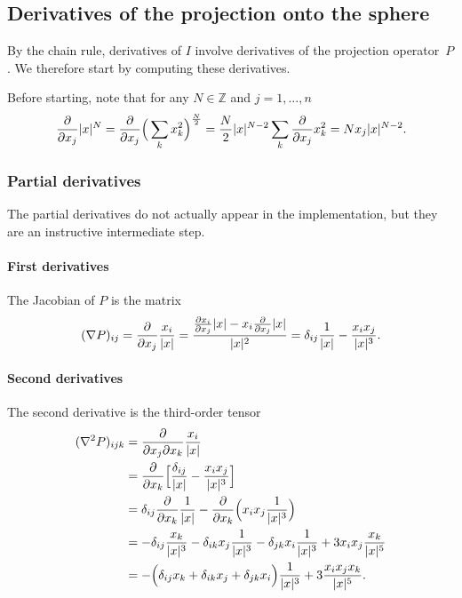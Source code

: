 \documentclass[a4paper]{article}
\DeclarePairedDelimiter{\abs}{\lvert}{\rvert}
\begin{document}
\subsection{Derivatives of the projection onto the sphere}

By the chain rule, derivatives of $I$ involve derivatives of the projection operator~$P$.
We therefore start by computing these derivatives.

Before starting, note that for any $N \in \mathbb{Z}$ and $j=1,\dots,n$
\begin{equation*}
 \frac{\partial}{\partial x_j} \abs{x}^N
 =
 \frac{\partial}{\partial x_j} \Big( \sum_k x_k^2 \Big)^{\frac{N}{2}}
 =
 \frac{N}{2} \abs{x}^{N-2} \sum_k \frac{\partial}{\partial x_j} x_k^2
 =
 N x_j \abs{x}^{N-2}.
\end{equation*}

\subsubsection{Partial derivatives}

The partial derivatives do not actually appear in the implementation, but they are
an instructive intermediate step.

\paragraph{First derivatives}

The Jacobian of $P$ is the matrix
 \begin{equation*}
  (\nabla P)_{ij}
  =
  \frac{\partial}{\partial x_j} \frac{x_i}{\abs{x}}
  =
  \frac{\frac{\partial x_i}{\partial x_j}\abs{x} - x_i \frac{\partial}{\partial x_j} \abs{x}}{\abs{x}^2}
  =
  \delta_{ij} \frac{1}{\abs{x}} - \frac{x_i x_j}{\abs{x}^3}.
 \end{equation*}

\paragraph{Second derivatives}
The second derivative is the third-order tensor
\begin{align*}
 (\nabla^2 P)_{ijk}
 & =
 \frac{\partial}{\partial x_j \partial x_k} \frac{x_i}{\abs{x}}
 \\
 & =
 \frac{\partial}{\partial x_k} \Big[ \frac{\delta_{ij}}{\abs{x}} - \frac{x_i x_j}{\abs{x}^3} \Big]
 \\
 & =
 \delta_{ij} \frac{\partial}{\partial x_k} \frac{1}{\abs{x}}
   - \frac{\partial}{\partial x_k}\Big( x_i x_j \frac{1}{\abs{x}^3} \Big)
 \\
 & =
 -\delta_{ij} \frac{x_k}{\abs{x}^3} - \delta_{ik} x_j \frac{1}{\abs{x}^3}
   - \delta_{jk} x_i \frac{1}{\abs{x}^3} + 3 x_i x_j \frac{x_k}{\abs{x}^5}
 \\
 & =
 - \Big( \delta_{ij}x_k + \delta_{ik}x_j + \delta_{jk}x_i\Big) \frac{1}{\abs{x}^3}
 + 3 \frac{x_i x_j x_k}{\abs{x}^5}.
\end{align*}
\end{document}
